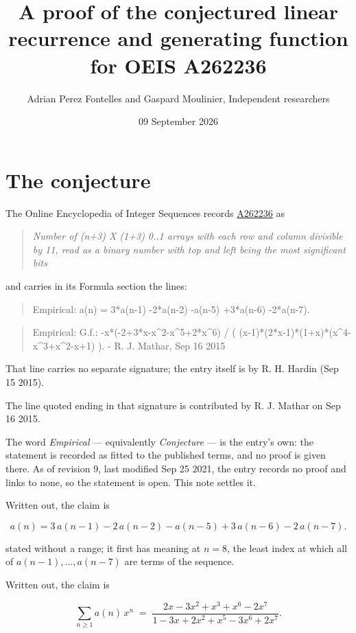\documentclass[11pt]{article}
\title{A proof of the conjectured linear recurrence and generating function for OEIS A262236}
\author{Adrian Perez Fontelles and Gaspard Moulinier, Independent researchers}
\date{09 September 2026}
\theoremstyle{definition}
\begin{document}
\maketitle
\section{The conjecture}

The Online Encyclopedia of Integer Sequences records \href{https://oeis.org/A262236}{A262236} as

\begin{quote}\itshape Number of (n+3) X (1+3) 0..1 arrays with each row and column divisible by 11, read as a binary number with top and left being the most significant bits\end{quote}

and carries in its Formula section the lines:

\begin{quote}\ttfamily Empirical: a(n) = 3*a(n-1) -2*a(n-2) -a(n-5) +3*a(n-6) -2*a(n-7).\end{quote}

\begin{quote}\ttfamily Empirical: G.f.: -x*(-2+3*x-x\textasciicircum{}2-x\textasciicircum{}5+2*x\textasciicircum{}6) / ( (x-1)*(2*x-1)*(1+x)*(x\textasciicircum{}4-x\textasciicircum{}3+x\textasciicircum{}2-x+1) ). - R. J. Mathar, Sep 16 2015\end{quote}

That line carries no separate signature; the entry itself is by R. H. Hardin (Sep 15 2015).

The line quoted ending in that signature is contributed by R. J. Mathar on Sep 16 2015.

The word {\itshape Empirical} --- equivalently {\itshape Conjecture} --- is the entry's own: the statement is recorded as fitted to the published terms, and no proof is given there. As of revision 9, last modified Sep 25 2021, the entry records no proof and links to none, so the statement is open. This note settles it.

Written out, the claim is

\[a(n) = 3\,a(n-1) - 2\,a(n-2) - a(n-5) + 3\,a(n-6) - 2\,a(n-7).\]

stated without a range; it first has meaning at $n = 8$, the least index at which all of $a(n-1),\dots,a(n-7)$ are terms of the sequence.

Written out, the claim is

\[\sum_{n \ge 1} a(n)\,x^n \;=\; \frac{2x - 3x^{2} + x^{3} + x^{6} - 2x^{7}}{1 - 3x + 2x^{2} + x^{5} - 3x^{6} + 2x^{7}}.\]
\end{document}
